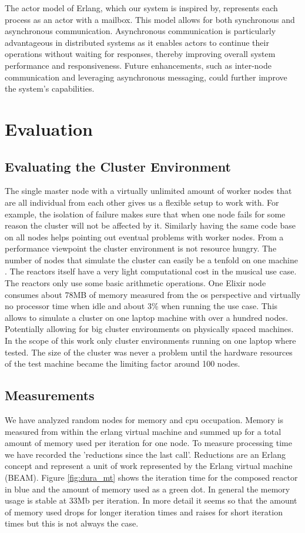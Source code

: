 \documentclass[a4paper]{book}
\begin{document}
The actor model of Erlang, which our system is inspired by, represents each process as an actor with a mailbox. This model allows for both synchronous and asynchronous communication. Asynchronous communication is particularly advantageous in distributed systems as it enables actors to continue their operations without waiting for responses, thereby improving overall system performance and responsiveness. Future enhancements, such as inter-node communication and leveraging asynchronous messaging, could further improve the system's capabilities.

\chapter{Evaluation} \label{sec:evaluation}


\section{Evaluating the Cluster Environment}

The single master node with a virtually unlimited amount of worker nodes that are all individual from each other gives us a flexible setup to work with. For example, the isolation of failure makes sure that when one node fails for some reason the cluster will not be affected by it. Similarly having the same code base on all nodes helps pointing out eventual problems with worker nodes. From a performance viewpoint the cluster environment is not resource hungry. The number of nodes that simulate the cluster can easily be a tenfold on one machine . The reactors itself have a very light computational cost in the musical use case. The reactors only use some basic arithmetic operations. One Elixir node consumes about 78MB of memory measured from the os perspective and virtually no processor time when idle and about 3\% when running the use case. This allows to simulate a cluster on one laptop machine with over a hundred nodes. Potentially allowing for big cluster environments on physically spaced machines. In the scope of this work only cluster environments running on one laptop where tested. The size of the cluster was never a problem until the hardware resources of the test machine became the limiting factor around 100 nodes.

\newpage

\section{Measurements}
We have analyzed random nodes for memory and cpu occupation. Memory is measured from within the erlang virtual machine and summed up for a total amount of memory used per iteration for one node. To measure processing time we have recorded the 'reductions since the last call'. Reductions are an Erlang concept and represent a unit of work represented by the Erlang virtual machine (BEAM). Figure \ref{fig:dura_mt} shows the iteration time for the composed reactor in blue and the amount of memory used as a green dot. In general the memory usage is stable at 33Mb per iteration. In more detail it seems so that the amount of memory used drops for longer iteration times and raises for short iteration times but this is not always the case.
\end{document}
